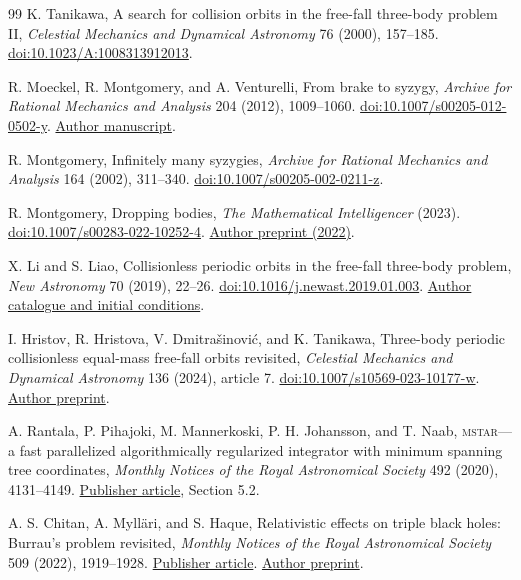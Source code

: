 \begin{thebibliography}{99}
K. Tanikawa, A search for collision orbits in the free-fall three-body
problem II, \emph{Celestial Mechanics and Dynamical Astronomy} 76 (2000),
157--185. \href{https://doi.org/10.1023/A:1008313912013}{doi:10.1023/A:1008313912013}.

R. Moeckel, R. Montgomery, and A. Venturelli, From brake to syzygy,
\emph{Archive for Rational Mechanics and Analysis} 204 (2012), 1009--1060.
\href{https://doi.org/10.1007/s00205-012-0502-y}{doi:10.1007/s00205-012-0502-y}.
\href{https://www-users.cse.umn.edu/~rmoeckel/research/BrakeSyzygy13.2.pdf}{Author manuscript}.

R. Montgomery, Infinitely many syzygies, \emph{Archive for Rational
Mechanics and Analysis} 164 (2002), 311--340.
\href{https://doi.org/10.1007/s00205-002-0211-z}{doi:10.1007/s00205-002-0211-z}.

R. Montgomery, Dropping bodies, \emph{The Mathematical Intelligencer}
(2023). \href{https://doi.org/10.1007/s00283-022-10252-4}{doi:10.1007/s00283-022-10252-4}.
\href{https://arxiv.org/abs/2207.02582}{Author preprint (2022)}.

X. Li and S. Liao, Collisionless periodic orbits in the free-fall three-body
problem, \emph{New Astronomy} 70 (2019), 22--26.
\href{https://doi.org/10.1016/j.newast.2019.01.003}{doi:10.1016/j.newast.2019.01.003}.
\href{https://numericaltank.sjtu.edu.cn/three-body/free-fall-3b/free-fall-3b-movies.htm}{Author catalogue and initial conditions}.

I. Hristov, R. Hristova, V. Dmitra\v sinovi\'c, and K. Tanikawa,
Three-body periodic collisionless equal-mass free-fall orbits revisited,
\emph{Celestial Mechanics and Dynamical Astronomy} 136 (2024), article 7.
\href{https://doi.org/10.1007/s10569-023-10177-w}{doi:10.1007/s10569-023-10177-w}.
\href{https://arxiv.org/abs/2308.16159}{Author preprint}.

A. Rantala, P. Pihajoki, M. Mannerkoski, P. H. Johansson, and T. Naab,
\textsc{mstar}---a fast parallelized algorithmically regularized integrator
with minimum spanning tree coordinates,
\emph{Monthly Notices of the Royal Astronomical Society} 492 (2020), 4131--4149.
\href{https://academic.oup.com/mnras/article/492/3/4131/5706852}{Publisher article}, Section 5.2.

A. S. Chitan, A. Myll\"ari, and S. Haque,
Relativistic effects on triple black holes: Burrau's problem revisited,
\emph{Monthly Notices of the Royal Astronomical Society} 509 (2022), 1919--1928.
\href{https://academic.oup.com/mnras/article/509/2/1919/6413565}{Publisher article}.
\href{https://arxiv.org/abs/2011.03046}{Author preprint}.


\end{thebibliography}
